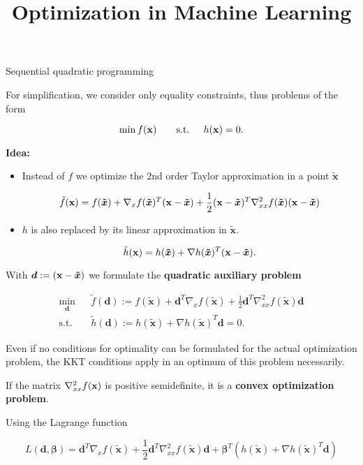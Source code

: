 \documentclass[11pt,compress,t,notes=noshow, xcolor=table]{beamer}
\title{Optimization in Machine Learning}
\date{}
\begin{document}
\sloppy


\begin{vbframe}{Sequential quadratic programming}

For simplification, we consider only equality constraints, thus problems of the form

$$
\min f(\mathbf{x}) \qquad \text{s.t. } \quad h(\mathbf{x}) = 0.
$$

\textbf{Idea:}

\begin{itemize}
\item Instead of $f$ we optimize the 2nd order Taylor approximation in a point $\bm{\tilde x}$

$$
\tilde f(\mathbf{x}) = f(\bm{\tilde x}) +  \nabla_{x} f(\bm{\tilde x})^T (\mathbf{x}- \bm{\tilde x})+ \frac{1}{2} (\mathbf{x}- \bm{\tilde x})^T \nabla^2_{xx} f(\bm{\tilde x}) (\mathbf{x}- \bm{\tilde x})
$$

\item $h$ is also replaced by its linear approximation in $\bm{\tilde x}$.

$$
\tilde h(\mathbf{x}) = h(\bm{\tilde x}) + \nabla h(\bm{\tilde x})^T(\mathbf{x}- \bm{\tilde x}).
$$
\end{itemize}

\framebreak

With $\bm{d} := (\mathbf{x}- \bm{\tilde x})$ we formulate the \textbf{quadratic auxiliary problem}

\begin{eqnarray*}
\min_{\bm{d}} && \tilde f(\bm{d}) := f(\bm{\tilde x}) + \bm{d}^T \nabla_{x} f(\bm{\tilde x}) + \frac{1}{2} \bm{d}^T \nabla^2_{xx} f(\bm{\tilde x}) \bm{d} \\
\text{s.t. } && \tilde h(\bm{d}) :=  h(\bm{\tilde x}) + \nabla h(\bm{\tilde x})^T\bm{d} = 0.
\end{eqnarray*}

Even if no conditions for optimality can be formulated for the actual optimization problem, the KKT conditions apply in an optimum of this problem necessarily.

\lz

If the matrix $\nabla^2_{xx} f(\mathbf{x})$ is positive semidefinite, it is a \textbf{convex optimization problem}.

\framebreak

Using the Lagrange function

$$
L(\bm{d}, \bm{\beta}) = \bm{d}^T \nabla_{x} f(\bm{\tilde x}) + \frac{1}{2} \bm{d}^T \nabla^2_{xx} f(\bm{\tilde x}) \bm{d} + \bm{\beta}^T (h(\bm{\tilde x}) + \nabla h(\bm{\tilde x})^T\bm{d})
$$


\end{vbframe}
\end{document}
